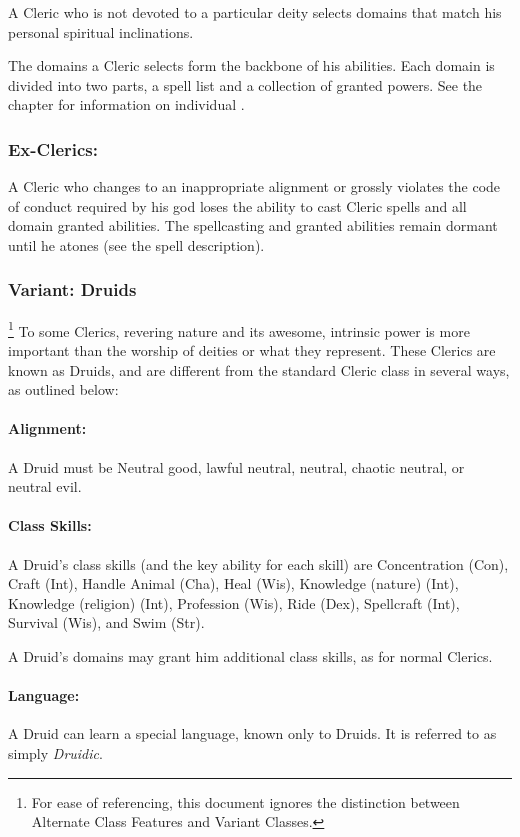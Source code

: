 A Cleric who is not devoted to a particular deity selects domains that match his personal spiritual inclinations.

The domains a Cleric selects form the backbone of his abilities.
Each domain is divided into two parts, a spell list and a collection of granted powers.
See the  chapter for information on individual .
\subsubsection{Ex-Clerics:}
A Cleric who changes to an inappropriate alignment or grossly violates the code of conduct required by his god loses the ability to cast Cleric spells and all domain granted abilities.
The spellcasting and granted abilities remain dormant until he atones (see the  spell description).
\subsubsection[Druid]{Variant: Druids}\footnote{For ease of referencing, this document ignores the distinction between Alternate Class Features and Variant Classes.}
\label{sec:Druid}
To some Clerics, revering nature and its awesome, intrinsic power is more important than the worship of deities or what they represent.
These Clerics are known as Druids, and are different from the standard Cleric class in several ways, as outlined below:

\paragraph{Alignment:} A Druid must be Neutral good, lawful neutral, neutral, chaotic neutral, or neutral evil.

\paragraph{Class Skills:} A Druid's class skills (and the key ability for each skill) are Concentration (Con), Craft (Int), Handle Animal (Cha), Heal (Wis), Knowledge (nature) (Int), Knowledge (religion) (Int), Profession (Wis), Ride (Dex), Spellcraft (Int), Survival (Wis), and Swim (Str).

A Druid's domains may grant him additional class skills, as for normal Clerics.

\paragraph{Language:} A Druid can learn a special language, known only to Druids. It is referred to as simply \emph{Druidic}.

